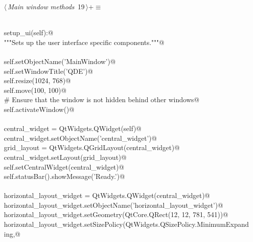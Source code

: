 \documentclass[
    a4paper,      %
    10pt,         %
    openright,    %
    notitlepage,  %
    parskip=half, %
]{scrreprt}       %
\theoremstyle{definition}                    %
\begin{document}

\begin{flushleft} \small
\begin{minipage}{\linewidth}\label{scrap11}\raggedright\small
{} $\langle\,${\itshape Main window methods}\nobreak\ {\footnotesize {19}}$\,\rangle+\equiv$
\vspace{-1ex}
\begin{list}{}{} \item
\mbox{}\lstinline@@\\
\mbox{}\lstinline@def setup_ui(self):@\\
\mbox{}\lstinline@    """Sets up the user interface specific components."""@\\
\mbox{}\lstinline@@\\
\mbox{}\lstinline@    self.setObjectName('MainWindow')@\\
\mbox{}\lstinline@    self.setWindowTitle('QDE')@\\
\mbox{}\lstinline@    self.resize(1024, 768)@\\
\mbox{}\lstinline@    self.move(100, 100)@\\
\mbox{}\lstinline@    # Ensure that the window is not hidden behind other windows@\\
\mbox{}\lstinline@    self.activateWindow()@\\
\mbox{}\lstinline@@\\
\mbox{}\lstinline@    central_widget = QtWidgets.QWidget(self)@\\
\mbox{}\lstinline@    central_widget.setObjectName('central_widget')@\\
\mbox{}\lstinline@    grid_layout = QtWidgets.QGridLayout(central_widget)@\\
\mbox{}\lstinline@    central_widget.setLayout(grid_layout)@\\
\mbox{}\lstinline@    self.setCentralWidget(central_widget)@\\
\mbox{}\lstinline@    self.statusBar().showMessage('Ready.')@\\
\mbox{}\lstinline@@\\
\mbox{}\lstinline@    horizontal_layout_widget = QtWidgets.QWidget(central_widget)@\\
\mbox{}\lstinline@    horizontal_layout_widget.setObjectName('horizontal_layout_widget')@\\
\mbox{}\lstinline@    horizontal_layout_widget.setGeometry(QtCore.QRect(12, 12, 781, 541))@\\
\mbox{}\lstinline@    horizontal_layout_widget.setSizePolicy(QtWidgets.QSizePolicy.MinimumExpanding,@\\

\end{list}
\end{minipage}
\end{flushleft}
\end{document}
